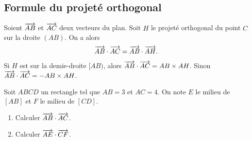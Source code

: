 \documentclass[11pt]{article}
\begin{document}
\subsection{Formule du projeté orthogonal}
\begin{prop}
  \begin{minipage}{.7\textwidth}
  Soient $\overrightarrow{AB}$ et $\overrightarrow{AC}$ deux vecteurs du plan. Soit $H$ le projeté
  orthogonal du point $C$ sur la droite $(AB)$. On a alors
  \[
    \overrightarrow{AB}\cdot\overrightarrow{AC}=\overrightarrow{AB}\cdot\overrightarrow{AH}.
  \]
  \end{minipage}
  \begin{minipage}{.3\textwidth}
    \begin{center}
    \end{center}
  \end{minipage}
\end{prop}

\begin{rmq}
  Si $H$ est sur la demie-droite $[AB)$, alors $\overrightarrow{AB}\cdot\overrightarrow{AC}=AB\times
    AH$. Sinon $\overrightarrow{AB}\cdot\overrightarrow{AC}=-AB\times AH$.
\end{rmq}

\begin{app}
  Soit $ABCD$ un rectangle tel que $AB=3$ et $AC=4$. On note $E$ le milieu de
  $\left[ AB \right]$ et $F$ le milieu de $\left[ CD \right]$.
  \begin{enumerate}
    \item Calculer $\overrightarrow{AB}\cdot\overrightarrow{AC}$.
    \item Calculer $\overrightarrow{AE}\cdot\overrightarrow{CF}$.
  \end{enumerate}
\end{app}
\end{document}
